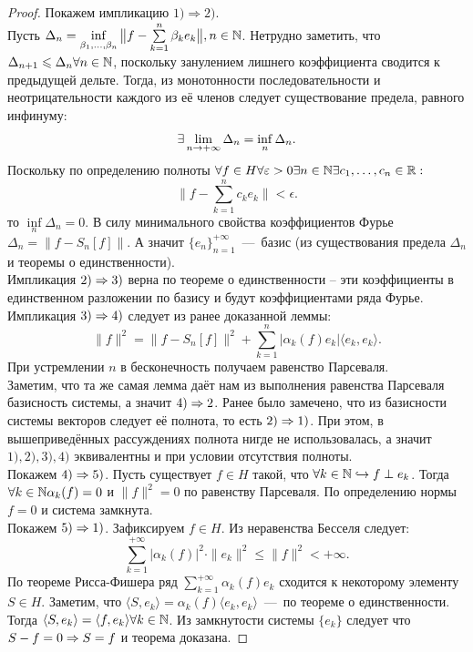 \begin{proof}
    Покажем импликацию $1) \Rightarrow 2)$. \\
    Пусть $\Delta_n = \inf\limits_{\beta_1, \ldots, \beta_n} \big\|f - \sum\limits_{k = 1}^n \beta_k e_k \big\|, n \in \mathbb{N}$.
    Нетрудно заметить, что $\Delta_{n + 1} \leqslant \Delta_n \forall n \in \mathbb{N}$, поскольку занулением лишнего коэффициента сводится к предыдущей дельте.
    Тогда, из монотонности последовательности и неотрицательности каждого из её членов следует существование предела, равного инфинуму:
    \[
        \exists \lim\limits_{n \rightarrow +\infty} \Delta_n = \inf\limits_n \Delta_n.
    \]
    Поскольку по определению полноты $\forall f \in H \forall \varepsilon > 0 \exists n \in \mathbb{N} \exists c_1, \ldots, c_n \in \mathbb{R}:$
    \[
        \|f - \sum\limits_{k = 1}^n c_k e_k\| < \epsilon.
    \]
    то $\inf\limits_n \Delta_n = 0$.
    В силу минимального свойства коэффициентов Фурье $\Delta_n = \|f - S_n[f]\|$.
    А значит $\{e_n\}_{n = 1}^{+\infty}$~---~базис (из существования предела $\Delta_n$ и теоремы о единственности). \\
    Импликация $2) \Rightarrow 3)$ верна по теореме о единственности -- эти коэффициенты в единственном разложении по базису и будут коэффициентами ряда Фурье. \\
    Импликация $3) \Rightarrow 4)$ следует из ранее доказанной леммы:
    \[
        \|f\|^2 = \|f - S_n[f]\|^2 + \sum\limits_{k = 1}^n |\alpha_k(f) e_k|\langle e_k, e_k \rangle.
    \]
    При устремлении $n$ в бесконечность получаем равенство Парсеваля. \\
    Заметим, что та же самая лемма даёт нам из выполнения равенства Парсеваля базисность системы, а значит $4) \Rightarrow 2$.
    Ранее было замечено, что из базисности системы векторов следует её полнота, то есть $2) \Rightarrow 1)$.
    При этом, в вышеприведённых рассуждениях полнота нигде не использовалась, а значит $1), 2), 3), 4)$ эквивалентны и при условии отсутствия полноты. \\
    Покажем $4) \Rightarrow 5)$.
    Пусть существует $f \in H$ такой, что $\forall k \in \mathbb{N} \hookrightarrow f \perp e_k$.
    Тогда $\forall k \in \mathbb{N} \alpha_k(f) = 0$ и $\|f\|^2 = 0$ по равенству Парсеваля.
    По определению нормы $f = 0$ и система замкнута. \\
    Покажем $5) \Rightarrow 1)$.
    Зафиксируем $f \in H$.
    Из неравенства Бесселя следует:
    \[
        \sum\limits_{k = 1}^{+\infty} |\alpha_k(f)|^2\cdot\|e_k\|^2 \leq \|f\|^2 < +\infty.
    \]
    По теореме Рисса-Фишера ряд $\sum\limits_{k = 1}^{+\infty} \alpha_k(f) e_k$ сходится к некоторому элементу $S \in H$.
    Заметим, что $\langle S, e_k \rangle = \alpha_k(f) \langle e_k, e_k \rangle$~---~по теореме о единственности.
    Тогда $\langle S, e_k \rangle = \langle f, e_k \rangle \forall k \in \mathbb{N}$.
    Из замкнутости системы $\{e_k\}$ следует что $S - f = 0 \Rightarrow S = f$ и теорема доказана.
\end{proof}

